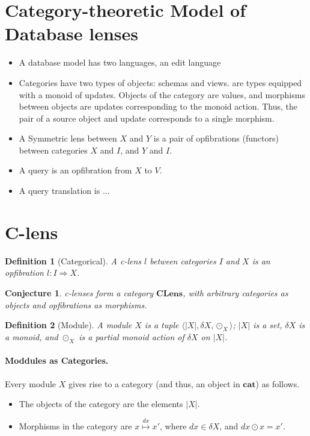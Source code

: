 \documentclass[a4paper,10pt]{article}
\newtheorem{definition}{Definition}
\newtheorem{conj}{Conjecture}
\newcommand{\cat}{\ensuremath{\mathbf{cat}}}
\newcommand{\clens}{\ensuremath{\mathbf{CLens}}}
\begin{document}
\section{Category-theoretic Model of Database lenses}
\begin{itemize}
 \item A database model has two languages, an edit language
 \item Categories have two types of objects: schemas and views. are types equipped with a monoid of updates. Objects of the category are values, and morphisms between objects are updates corresponding to the monoid action. Thus, the pair of a source object and update corresponds to a single morphism. 
 \item A Symmetric lens between $X$ and $Y$ is a pair of opfibrations (functors) between categories $X$ and $I$, and $Y$ and $I$.
 \item A query is an opfibration from $X$ to $V$.
 \item A query translation is $\ldots$
\end{itemize}

\section{C-lens}
\begin{definition}[Categorical]
 A c-lens $l$ between categories $I$ and $X$ is an opfibration $l : I \Rightarrow X$.
\end{definition}

\begin{conj}
 c-lenses form a category \clens, with arbitrary categories as objects and opfibrations as morphisms.
\end{conj}

\begin{definition} [Module]
  A module $X$ is a tuple $\langle |X|, \delta X, \odot_X \rangle$; $|X|$ is a set, $\delta X$ is a monoid, and $\odot_X$ is a partial monoid action of $\delta X$ on $|X|$.
\end{definition}

\paragraph*{Moddules as Categories.}
 Every module $X$ gives rise to a category (and thus, an object in $\cat$) as follows. 
\begin {itemize}
\item The objects of the category are the elements $|X|$. 
\item Morphisms in the category are $x \stackrel{dx}{\mapsto} x'$, where $dx \in \delta X$, and $dx \odot x = x'$.
\end{itemize}
\end{document}
